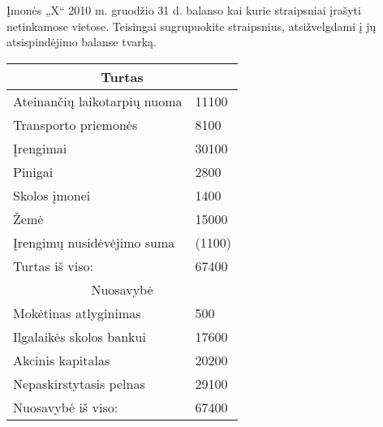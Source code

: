 \begin{tasks}
  \begin{task}
    \begin{condition}
      Įmonės „X“ 2010 m. gruodžio 31 d. balanso kai kurie straipsniai
      įrašyti netinkamose vietose. Teisingai sugrupuokite straipsnius,
      atsižvelgdami į jų atsispindėjimo balanse tvarką.
    \end{condition}
    \begin{solution}
      \begin{tabularx}{\tablewidth}[]{l | X}
        \multicolumn{2}{c}{Turtas} \\
        \hline
        Ateinančių laikotarpių nuoma & 11100 \\
        Transporto priemonės & 8100 \\
        Įrengimai & 30100 \\
        Pinigai & 2800 \\
        Skolos įmonei & 1400 \\
        Žemė & 15000 \\
        Įrengimų nusidėvėjimo suma & (1100) \\
        \hline
        Turtas iš viso: & 67400 \\
        \multicolumn{2}{c}{Nuosavybė} \\
        \hline
        Mokėtinas atlyginimas & 500 \\
        Ilgalaikės skolos bankui & 17600 \\
        Akcinis kapitalas & 20200 \\
        Nepaskirstytasis pelnas & 29100 \\
        \hline
        Nuosavybė iš viso: & 67400 \\
      \end{tabularx}
    \end{solution}
  \end{task}


\end{tasks}
